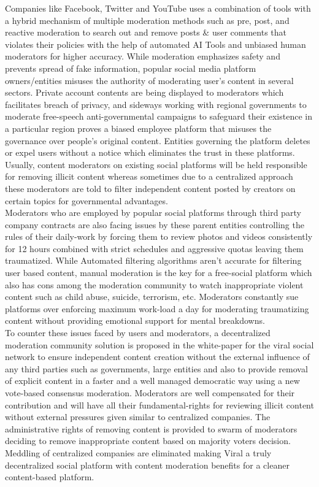 \documentclass[10pt]{article}
\begin{document}
Companies like Facebook, Twitter and YouTube uses a combination of tools with a hybrid mechanism of multiple moderation methods such as pre, post, and reactive moderation to search out and remove posts \& user comments that violates their policies with the help of automated AI Tools and unbiased human moderators for higher accuracy. While moderation emphasizes safety and prevents spread of fake information, popular social media platform owners/entities misuses the authority of moderating user's content in several sectors. Private account contents are being displayed to moderators which facilitates breach of privacy, and sideways working with regional governments to moderate free-speech anti-governmental campaigns to safeguard their existence in a particular region proves a biased employee platform that misuses the governance over people's original content. Entities governing the platform deletes or expel users without a notice which eliminates the trust in these platforms. Usually, content moderators on existing social platforms will be held responsible for removing illicit content whereas sometimes due to a centralized approach these moderators are told to filter independent content posted by creators on certain topics for governmental advantages.\\

Moderators who are employed by popular social platforms through third party company contracts are also facing issues by these parent entities controlling the rules of their daily-work by forcing them to review photos and videos consistently for 12 hours combined with strict schedules and aggressive quotas leaving them traumatized. While Automated filtering algorithms aren't accurate for filtering user based content, manual moderation is the key for a free-social platform which also has cons among the moderation community to watch inappropriate violent content such as child abuse, suicide, terrorism, etc. Moderators constantly sue platforms over enforcing maximum work-load a day for moderating traumatizing content without providing emotional support for mental breakdowns.\\

To counter these issues faced by users and moderators, a decentralized moderation community solution is proposed in the white-paper for the viral social network to ensure independent content creation without the external influence of any third parties such as governments, large entities and also to provide removal of explicit content in a faster and a well managed democratic way using a new vote-based consensus moderation. Moderators are well compensated for their contribution and will have all their fundamental-rights for reviewing illicit content without external pressures given similar to centralized companies. The administrative rights of removing content is provided to swarm of moderators deciding to remove inappropriate content based on majority voters decision. Meddling of centralized companies are eliminated making Viral a truly decentralized social platform with content moderation benefits for a cleaner content-based platform.\\
\end{document}
